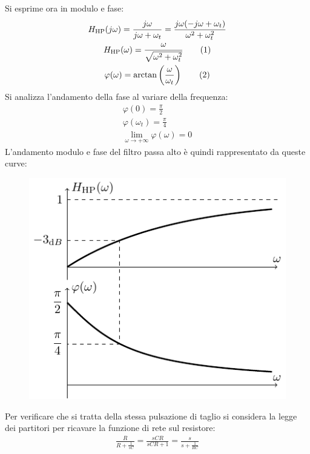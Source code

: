 \documentclass{article}
\newcommand{\tageq}{\tag{\stepcounter{equation}\theequation}}
\numberwithin{equation}{subsection}
\begin{document}
Si esprime ora in modulo e fase:
\begin{gather*}
    H_{\mathrm{HP}}(j\omega)=\displaystyle\frac{j\omega}{j\omega+\omega_t}=\frac{j\omega(-j\omega+\omega_t)}{\omega^2+\omega_t^2}\\
    H_{\mathrm{HP}}(\omega)=\displaystyle\frac{\omega}{\sqrt{\omega^2+\omega_t^2}}\tageq\\
    \varphi(\omega)=\arctan\left(\displaystyle\frac{\omega}{\omega_t}\right)\tageq
\end{gather*}
Si analizza l'andamento della fase al variare della frequenza:
\begin{gather*}
    \varphi(0)=\displaystyle\frac{\pi}{2}\\
    \varphi(\omega_t)=\displaystyle\frac{\pi}{4}\\
    \lim_{\omega\to+\infty}\varphi(\omega)=0
\end{gather*}
L'andamento modulo e fase del filtro passa alto è quindi rappresentato da queste curve: 
\begin{figure}[H]%
    \centering
    \includegraphics{passa-alto-primo-ordine.pdf}%
\end{figure}
Per verificare che si tratta della stessa pulsazione di taglio si considera la legge dei partitori per ricavare la funzione di rete sul resistore:
\begin{gather*}
    \displaystyle\frac{R}{R+\displaystyle\frac{1}{sC}}=\frac{sCR}{sCR+1}=\frac{s}{s+\displaystyle\frac{1}{RC}}
\end{gather*}
\end{document}
